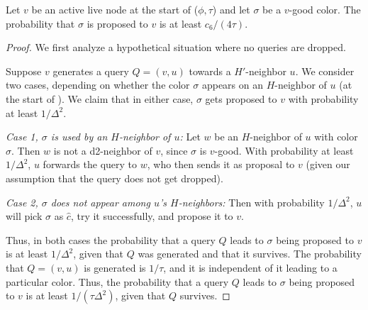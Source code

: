 \begin{lemma}
Let $v$ be an active live node at the start of ($\phi,\tau$) and let $\sigma$ be a $v$-good color. The probability that $\sigma$ is proposed to $v$ is at least $c_6/(4\tau)$.
\label{L:sigma}
\end{lemma}
\begin{proof}
We first analyze a hypothetical situation where no queries are dropped.

Suppose $v$ generates a query $Q=(v,u)$ towards a $H'$-neighbor $u$.
%
We consider two cases, depending on whether the color $\sigma$ appears on an $H$-neighbor of $u$ (at the start of ). We claim that in either case, $\sigma$ gets proposed to $v$ with probability at least $1/\Delta^2$.

\textit{Case 1, $\sigma$ is used by an $H$-neighbor  of $u$: } Let $w$ be an $H$-neighbor of $u$ with color $\sigma$. Then $w$ is not a d2-neighbor of $v$, since $\sigma$ is $v$-good.
With probability at least $1/\Delta^2$, $u$ forwards the query to $w$, who then sends it as proposal to $v$ (given our assumption that the query does not get dropped).

\textit{Case 2, $\sigma$ does not appear among $u$'s $H$-neighbors:} Then with probability $1/\Delta^2$, $u$ will pick $\sigma$ as $\hat{c}$, try it successfully, and propose it to $v$.

Thus, in both cases the probability that a query $Q$ leads to $\sigma$ being proposed to $v$ is at least $1/\Delta^2$, given that $Q$ was generated and that it survives.
The probability that $Q=(v,u)$ is generated is $1/\tau$, and it is independent of it leading to a particular color.
Thus, the probability that a query $Q$ leads to $\sigma$ being proposed to $v$ is at least $1/(\tau\Delta^2)$, given that $Q$ survives. 



\end{proof}
